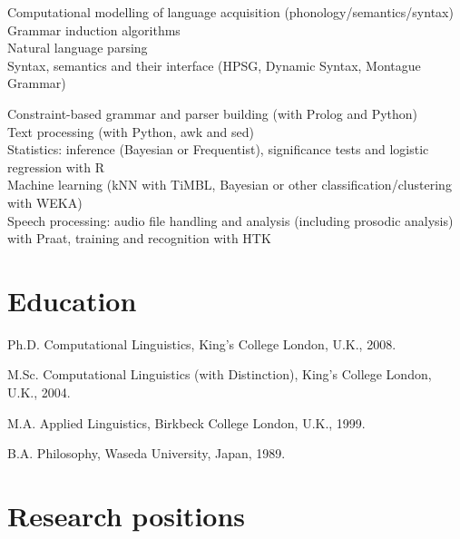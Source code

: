 \documentclass[a4paper]{article}
\renewenvironment{itemize}{
  \begin{list}{}{
    \setlength{\leftmargin}{1.5em}
  }
}{
  \end{list}
}
\begin{document}
\begin{itemize}
\item Computational modelling of language acquisition
  (phonology/semantics/syntax)\\ Grammar induction algorithms\\ Natural
  language parsing\\ Syntax, semantics and their interface (HPSG,
  Dynamic Syntax, Montague Grammar)

  Constraint-based grammar and parser building (with Prolog and Python)\\
  Text processing (with Python, awk and sed)\\
  Statistics: inference (Bayesian or Frequentist), significance tests and logistic regression with R\\
  Machine learning (kNN with TiMBL, Bayesian or other classification/clustering with WEKA)\\
  Speech processing: audio file handling and analysis (including
  prosodic analysis) with Praat, training and recognition with HTK
\end{itemize}

\section*{Education}

\begin{itemize}
  \item Ph.D. Computational Linguistics, King's College London, U.K., 2008.

  \item M.Sc. Computational Linguistics (with Distinction), King's College London, U.K., 2004.

  \item M.A. Applied Linguistics, Birkbeck College London, U.K., 1999.

  \item B.A. Philosophy, Waseda University, Japan, 1989.
\end{itemize}


\section*{Research positions}
\end{document}

